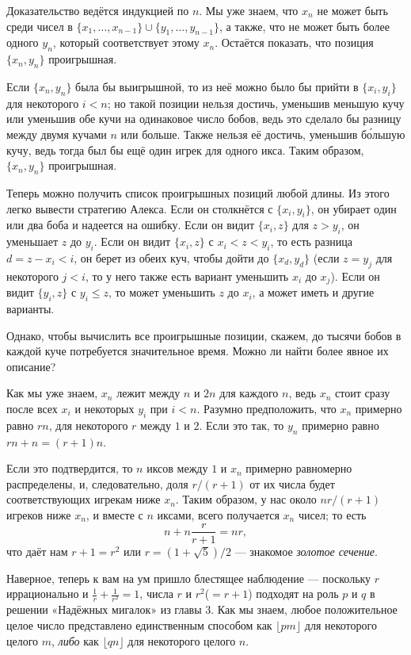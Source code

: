 Доказательство ведётся индукцией по $n$.
Мы уже знаем, что $x_n$ не может быть среди чисел в $\{x_1, \dots , x_{n-1}\} \cup \{y_1, \dots , y_{n-1}\}$, а также, что не может быть более одного $y_n$, который соответствует этому $x_n$.
Остаётся показать, что позиция $\{x_n, y_n\}$ проигрышная.

Если $\{x_n, y_n\}$ была бы выигрышной, то из неё можно было бы прийти в $\{x_i, y_i\}$ для некоторого $i < n$; но такой позиции нельзя достичь, уменьшив меньшую кучу или уменьшив обе кучи на одинаковое число бобов, ведь это сделало бы разницу между двумя кучами $n$ или больше.
Также нельзя её достичь, уменьшив б\'{о}льшую кучу, ведь тогда был бы ещё один игрек для одного икса.
Таким образом, $\{x_n, y_n\}$ проигрышная.

Теперь можно получить список проигрышных позиций любой длины.
Из этого легко вывести стратегию Алекса.
Если он столкнётся с $\{x_i , y_i\}$, он убирает один или два боба и надеется на ошибку.
Если он видит $\{x_i , z\}$ для $z > y_i$, он уменьшает $z$ до $y_i$.
Если он видит $\{x_i , z\}$ с $x_i < z < y_i$, то есть разница $d = z - x_i < i$, он берет из обеих куч, чтобы дойти до $\{x_d , y_d\}$ (если $z = y_j$ для некоторого $j < i$, то у него также есть вариант уменьшить $x_i$ до $x_j$).
Если он видит $\{y_i , z\}$ с $y_i \le z$, то может уменьшить $z$ до $x_i$, а может иметь и другие варианты.


Однако, чтобы вычислить все проигрышные позиции, скажем, до тысячи бобов в каждой куче потребуется значительное время.
Можно ли найти более явное их описание?

Как мы уже знаем, $x_n$ лежит между $n$ и $2n$ для каждого $n$, ведь $x_n$ стоит сразу после всех $x_i$ и некоторых $y_i$ при $i < n$.
Разумно предположить, что $x_n$ примерно равно $rn$, для некоторого $r$ между $1$ и $2$.
Если это так, то $y_n$ примерно равно $rn + n = (r + 1)n$.

Если это подтвердится, то $n$ иксов между $1$ и $x_n$ примерно равномерно распределены, и, следовательно, доля $r/(r + 1)$ от их числа будет соответствующих игрекам ниже $x_n$.
Таким образом, у нас около $nr/(r + 1)$ игреков ниже $x_n$, и вместе с $n$ иксами, всего получается $x_n$ чисел; то есть
\[n+n\frac{r}{r+1}=nr,\]
что даёт нам $r + 1 = r^2$ или $r = (1 + \sqrt{5})/2$ --- знакомое \emph{золотое сечение}.

Наверное, теперь к вам на ум пришло блестящее наблюдение --- поскольку $r$ иррационально и $\tfrac1r+\tfrac1{r^2}=1$, числа $r$ и $r^2$($= r + 1$) подходят на роль $p$ и $q$ в решении «Надёжных мигалок» из главы 3.
Как мы знаем, любое положительное целое число представлено единственным способом как $\lfloor pm\rfloor$ для некоторого целого $m$, \emph{либо} как $\lfloor qn\rfloor$ для некоторого целого $n$.

